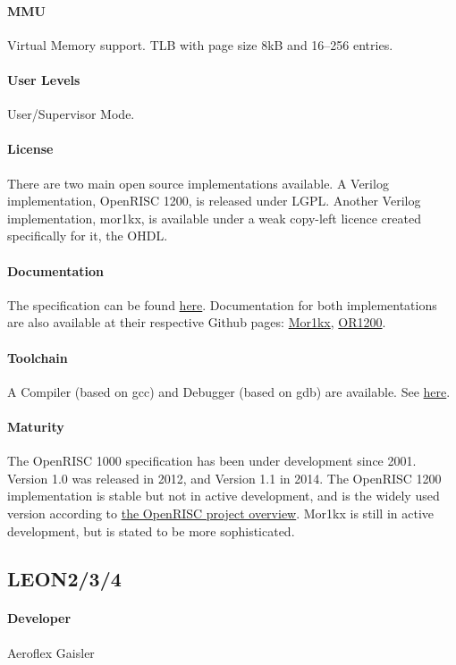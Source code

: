 \documentclass[11pt]{article} %
\begin{document}
\paragraph{MMU} Virtual Memory support. TLB with page size 8kB and 16--256 entries.
\paragraph{User Levels} User/Supervisor Mode.
\paragraph{License} There are two main open source implementations available. A Verilog implementation, OpenRISC 1200, is released under LGPL. Another Verilog implementation, mor1kx, is available under a weak copy-left licence created specifically for it, the OHDL.
\paragraph{Documentation} The specification can be found \href{https://github.com/openrisc/doc/blob/master/openrisc-arch-1.1-rev0.pdf?raw=true}{here}. Documentation for both implementations are also available at their respective Github pages: \href{https://github.com/openrisc/mor1kx}{Mor1kx}, \href{https://github.com/openrisc/or1200}{OR1200}.
\paragraph{Toolchain} A Compiler (based on gcc) and Debugger (based on gdb) are available. See \href{http://opencores.org/or1k/OpenRISC_GNU_tool_chain#Tools}{here}.
\paragraph{Maturity} The OpenRISC 1000 specification has been under development since 2001. Version 1.0 was released in 2012, and Version 1.1 in 2014. The OpenRISC 1200 implementation is stable but not in active development, and is the widely used version according to \href{http://openrisc.github.io/}{the OpenRISC project overview}. Mor1kx is still in active development, but is stated to be more sophisticated.

\subsection{LEON2/3/4}
\paragraph{Developer} Aeroflex Gaisler
\end{document}
